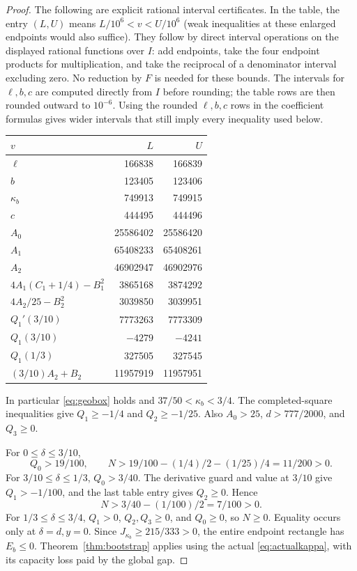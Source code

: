\begin{proof}
The following are explicit rational interval certificates. In the table, the entry $(L,U)$ means $L/10^6<v<U/10^6$ (weak inequalities at these enlarged endpoints would also suffice). They follow by direct interval operations on the displayed rational functions over $I$: add endpoints, take the four endpoint products for multiplication, and take the reciprocal of a denominator interval excluding zero. No reduction by $F$ is needed for these bounds. The intervals for $\ell,b,c$ are computed directly from $I$ before rounding; the table rows are then rounded outward to $10^{-6}$. Using the rounded $\ell,b,c$ rows in the coefficient formulas gives wider intervals that still imply every inequality used below.
\begin{center}
\begin{tabular}{lrr}
\toprule
$v$&$L$&$U$\\
\midrule
$\ell$&166838&166839\\
$b$&123405&123406\\
$\kappa_b$&749913&749915\\
$c$&444495&444496\\
$A_0$&25586402&25586420\\
$A_1$&65408233&65408261\\
$A_2$&46902947&46902976\\
$4A_1(C_1+1/4)-B_1^2$&3865168&3874292\\
$4A_2/25-B_2^2$&3039850&3039951\\
$Q_1'(3/10)$&7773263&7773309\\
$Q_1(3/10)$&$-4279$&$-4241$\\
$Q_1(1/3)$&327505&327545\\
$(3/10)A_2+B_2$&11957919&11957951\\
\bottomrule
\end{tabular}
\end{center}
In particular \eqref{eq:geobox} holds and $37/50<\kappa_b<3/4$. The completed-square inequalities give $Q_1\ge-1/4$ and $Q_2\ge-1/25$. Also $A_0>25$, $d>777/2000$, and $Q_3\ge0$.

For $0\le\delta\le3/10$,
\[
 Q_0>19/100,\qquad
 N>19/100-(1/4)/2-(1/25)/4=11/200>0.
\]
For $3/10\le\delta\le1/3$, $Q_0>3/40$. The derivative guard and value at $3/10$ give $Q_1>-1/100$, and the last table entry gives $Q_2\ge0$. Hence
\[
 N>3/40-(1/100)/2=7/100>0.
\]
For $1/3\le\delta\le3/4$, $Q_1>0$, $Q_2,Q_3\ge0$, and $Q_0\ge0$, so $N\ge0$. Equality occurs only at $\delta=d,y=0$. Since $J_{\kappa_b}\ge215/333>0$, the entire endpoint rectangle has $E_b\le0$. Theorem~\ref{thm:bootstrap} applies using the actual \eqref{eq:actualkappa}, with its capacity loss paid by the global gap.


\end{proof}
